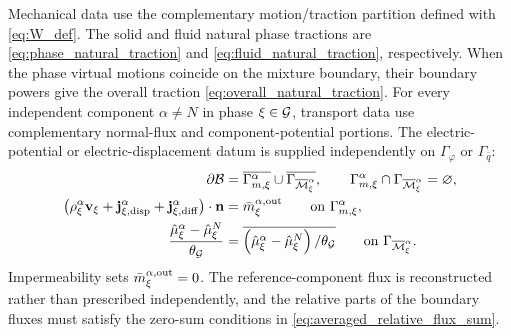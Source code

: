 Mechanical data use the complementary motion/traction partition defined with
\eqref{eq:W_def}.  The solid and fluid natural phase tractions are
\eqref{eq:phase_natural_traction} and
\eqref{eq:fluid_natural_traction}, respectively.  When the phase virtual motions
coincide on the mixture boundary, their boundary powers give the overall
traction \eqref{eq:overall_natural_traction}.  For every independent component
\(\alpha\ne N\) in phase \(\xi\in\mathcal{G}\), transport data use complementary
normal-flux and component-potential portions.  The electric-potential or
electric-displacement datum is supplied independently on
\(\Gamma_\varphi\) or \(\Gamma_{\bar q}\):
%
\begin{subequations}
	\label{eq:component_boundary_data}
	\begin{align}
		\partial\mathcal{B}
		 & =
		\overline{\Gamma_{m,\xi}^{\alpha}}
		\cup
		\overline{\Gamma_{\overline{\mathcal{M}}_\xi^\alpha}},
		\qquad
		\Gamma_{m,\xi}^{\alpha}
		\cap
		\Gamma_{\overline{\mathcal{M}}_\xi^\alpha}
		=\varnothing,
		\label{eq:component_boundary_partition} \\
		\left(
			\rho_\xi^\alpha\mathbf{v}_\xi
			+
			\mathbf{j}_{\xi,{\rm disp}}^\alpha
			+
			\mathbf{j}_{\xi,{\rm diff}}^\alpha
		\right)\cdot\mathbf{n}
		 & =
		\bar m_{\xi}^{\alpha,{\rm out}}
		\qquad
		\text{on }\Gamma_{m,\xi}^{\alpha},
		\label{eq:component_normal_flux_boundary_data} \\
		\frac{\hat\mu_\xi^\alpha-\hat\mu_\xi^N}{\theta_{\mathcal{G}}}
		 & =
		\overline{
			\left(
			\hat\mu_\xi^\alpha-\hat\mu_\xi^N
			\right)/\theta_{\mathcal{G}}
		}
		\qquad
		\text{on }\Gamma_{\overline{\mathcal{M}}_\xi^\alpha}.
		\label{eq:component_potential_boundary_data}
	\end{align}
\end{subequations}
%
Impermeability sets
\(\bar m_{\xi}^{\alpha,{\rm out}}=0\).  The reference-component flux is
reconstructed rather than prescribed independently, and the relative parts of
the boundary fluxes must satisfy the zero-sum conditions in
\eqref{eq:averaged_relative_flux_sum}.

